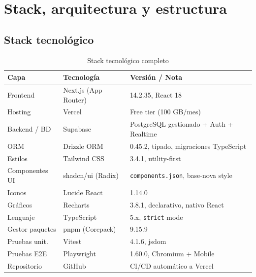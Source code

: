 \documentclass[12pt,a4paper,oneside]{report}
\newcommand{\file}[1]{\texttt{\color{cecyteDark}#1}}
\begin{document}
\chapter{Stack, arquitectura y estructura}

\section{Stack tecnológico}

\begin{table}[H]
\centering
\caption{Stack tecnológico completo}
\begin{tabular}{@{}L{4cm}L{5cm}L{6cm}@{}}
\toprule
{}
\textbf{Capa} & \textbf{Tecnología} & \textbf{Versión / Nota} \\
\midrule
Frontend       & Next.js (App Router)        & 14.2.35, React 18 \\
Hosting        & Vercel                      & Free tier (100 GB/mes) \\
Backend / BD   & Supabase                    & PostgreSQL gestionado + Auth + Realtime \\
ORM            & Drizzle ORM                 & 0.45.2, tipado, migraciones TypeScript \\
Estilos        & Tailwind CSS                & 3.4.1, utility-first \\
Componentes UI & shadcn/ui (Radix)           & \file{components.json}, base-nova style \\
Iconos         & Lucide React                & 1.14.0 \\
Gráficos       & Recharts                    & 3.8.1, declarativo, nativo React \\
Lenguaje       & TypeScript                  & 5.x, \texttt{strict} mode \\
Gestor paquetes& pnpm (Corepack)             & 9.15.9 \\
Pruebas unit.  & Vitest                      & 4.1.6, jsdom \\
Pruebas E2E    & Playwright                  & 1.60.0, Chromium + Mobile \\
Repositorio    & GitHub                      & CI/CD automático a Vercel \\
\bottomrule
\end{tabular}
\end{table}
\end{document}
